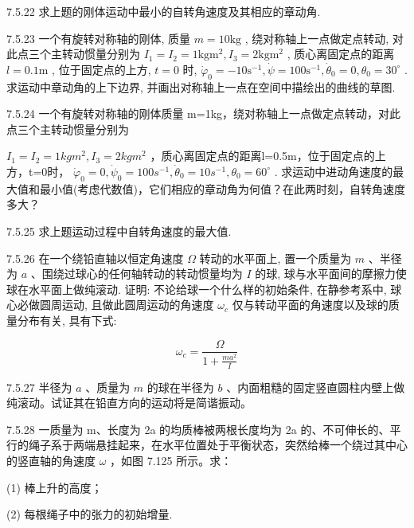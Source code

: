 \begin{problem}{7.5.22}
求上题的刚体运动中最小的自转角速度及其相应的章动角.
\end{problem}
\clearpage


\begin{problem}{7.5.23}
一个有旋转对称轴的刚体, 质量 $m = 10\mathrm{kg}$ , 绕对称轴上一点做定点转动, 对此点三个主转动惯量分别为 $I_{1} = I_{2} = 1\mathrm{kg}\mathrm{m}^{2}, I_{3} = 2\mathrm{kg}\mathrm{m}^{2}$ , 质心离固定点的距离 $l = 0.1\mathrm{m}$ , 位于固定点的上方, $t = 0$ 时, $\dot{\varphi}_{0} = -10\mathrm{s}^{-1}, \dot{\psi} = 100\mathrm{s}^{-1}, \dot{\theta}_{0} = 0, \theta_{0} = 30^{\circ}$ . 求运动中章动角的上下边界, 并画出对称轴上一点在空间中描绘出的曲线的草图.
\end{problem}
\clearpage


\begin{problem}{7.5.24}
一个有旋转对称轴的刚体质量 m=1kg，绕对称轴上一点做定点转动，对此点三个主转动惯量分别为

$I_{1}=I_{2}=1kgm^{2},I_{3}=2kgm^{2}$ ，质心离固定点的距离l=0.5m，位于固定点的上方，t=0时， $\dot{\varphi}_{0}=0,\dot{\psi}_{0}=100s^{-1},\dot{\theta}_{0}=10s^{-1},\theta_{0}=60^{\circ}$ . 求运动中进动角速度的最大值和最小值(考虑代数值)，它们相应的章动角为何值？在此两时刻，自转角速度多大？
\end{problem}
\clearpage


\begin{problem}{7.5.25}
求上题运动过程中自转角速度的最大值.
\end{problem}
\clearpage


\begin{problem}{7.5.26}
在一个绕铅直轴以恒定角速度 $\Omega$ 转动的水平面上, 置一个质量为 $m$ 、半径为 $a$ 、围绕过球心的任何轴转动的转动惯量均为 $I$ 的球, 球与水平面间的摩擦力使球在水平面上做纯滚动. 证明: 不论给球一个什么样的初始条件, 在静参考系中, 球心必做圆周运动, 且做此圆周运动的角速度 $\omega_{c}$ 仅与转动平面的角速度以及球的质量分布有关, 具有下式:

\[
\omega_ {c} = \frac {\Omega}{1 + \frac {m a ^ {2}}{I}}
\]
\end{problem}
\clearpage


\begin{problem}{7.5.27}
半径为 $a$ 、质量为 $m$ 的球在半径为 $b$ 、内面粗糙的固定竖直圆柱内壁上做纯滚动。试证其在铅直方向的运动将是简谐振动。
\end{problem}
\clearpage


\begin{problem}{7.5.28}
一质量为 m、长度为 2a 的均质棒被两根长度均为 2a 的、不可伸长的、平行的绳子系于两端悬挂起来，在水平位置处于平衡状态，突然给棒一个绕过其中心的竖直轴的角速度 $\omega$ ，如图 7.125 所示。求：

(1) 棒上升的高度；

(2) 每根绳子中的张力的初始增量.
\begin{center}

\end{center}
\end{problem}
\clearpage


